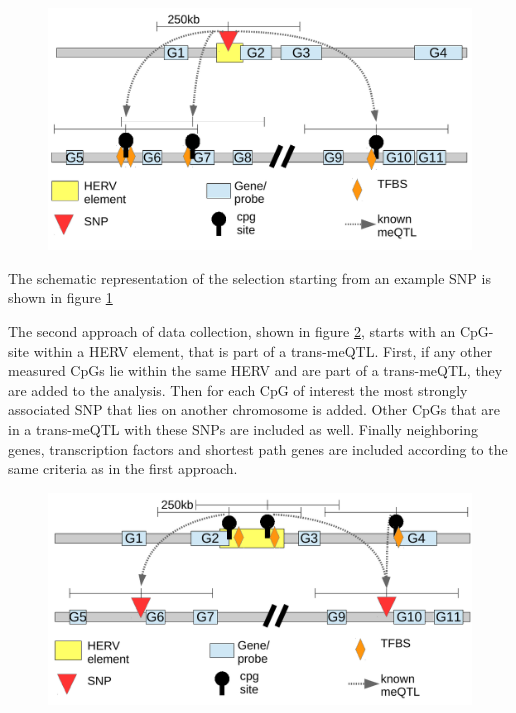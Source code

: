 \documentclass[a4paper,12pt,twoside,openright]{report}
\begin{document}
\begin{figure}[b!]
	\includegraphics[scale=0.86, keepaspectratio = true]{../figures/ggm_data_collect_snp_scheme}
	\caption{}
	\label{fig:ggm.data.collect.snp.scheme}
\end{figure}

The schematic representation of the selection starting from an example SNP is shown in figure \ref{fig:ggm.data.collect.snp.scheme}

The second approach of data collection, shown in figure \ref{fig:ggm.data.collect.cpg.scheme}, starts with an CpG-site within a HERV element, that is part of a trans-meQTL. First, if any other measured CpGs lie within the same HERV and are part of a trans-meQTL, they are added to the analysis. Then for each CpG of interest the most strongly associated SNP that lies on another chromosome is added. Other CpGs that are in a trans-meQTL with these SNPs are included as well. Finally neighboring genes, transcription factors and shortest path genes are included according to the same criteria as in the first approach.

\begin{figure}[b!]
	\includegraphics[scale=0.86, keepaspectratio = true]{../figures/ggm_data_collect_cpg_scheme}
	\caption{}
	\label{fig:ggm.data.collect.cpg.scheme}
\end{figure}
\end{document}
